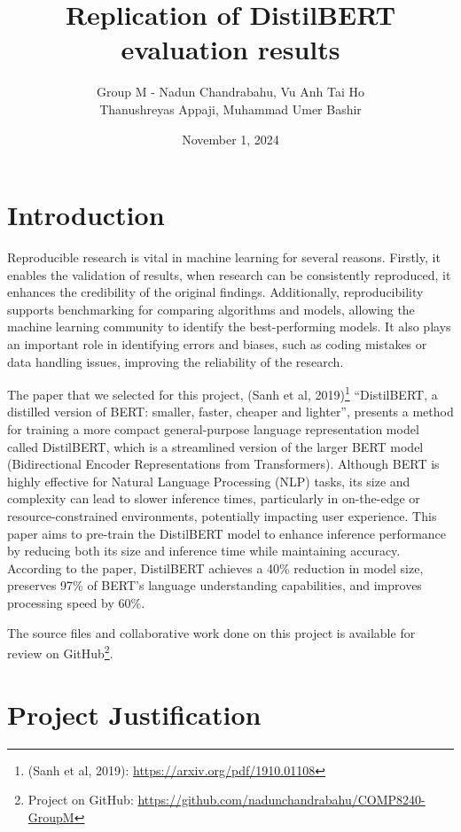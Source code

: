\documentclass[
  11pt,
]{article}
\title{Replication of DistilBERT evaluation results}
\author{Group M - Nadun Chandrabahu, Vu Anh Tai Ho\\
Thanushreyas Appaji, Muhammad Umer Bashir}
\date{November 1, 2024}
\begin{document}
\maketitle

\section{Introduction}\label{introduction}

Reproducible research is vital in machine learning for several reasons.
Firstly, it enables the validation of results, when research can be
consistently reproduced, it enhances the credibility of the original
findings. Additionally, reproducibility supports benchmarking for
comparing algorithms and models, allowing the machine learning community
to identify the best-performing models. It also plays an important role
in identifying errors and biases, such as coding mistakes or data
handling issues, improving the reliability of the research.

The paper that we selected for this project, (Sanh et al,
2019)\footnote{(Sanh et al, 2019):
  \url{https://arxiv.org/pdf/1910.01108}} ``DistilBERT, a distilled
version of BERT: smaller, faster, cheaper and lighter'', presents a
method for training a more compact general-purpose language
representation model called DistilBERT, which is a streamlined version
of the larger BERT model (Bidirectional Encoder Representations from
Transformers). Although BERT is highly effective for Natural Language
Processing (NLP) tasks, its size and complexity can lead to slower
inference times, particularly in on-the-edge or resource-constrained
environments, potentially impacting user experience. This paper aims to
pre-train the DistilBERT model to enhance inference performance by
reducing both its size and inference time while maintaining accuracy.
According to the paper, DistilBERT achieves a 40\% reduction in model
size, preserves 97\% of BERT's language understanding capabilities, and
improves processing speed by 60\%.

The source files and collaborative work done on this project is
available for review on GitHub\footnote{Project on GitHub:
  \url{https://github.com/nadunchandrabahu/COMP8240-GroupM}}.

\section{Project Justification}\label{project-justification}
\end{document}

